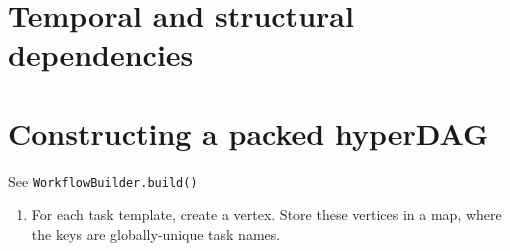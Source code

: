 \documentclass{report}
\begin{document}
\section{Temporal and structural dependencies}

\section{Constructing a packed hyperDAG}

See \texttt{WorkflowBuilder.build()}

\begin{enumerate}
\item For each task template, create a vertex. Store these vertices in a map, where the keys are globally-unique task names.
\end{enumerate}
\end{document}

